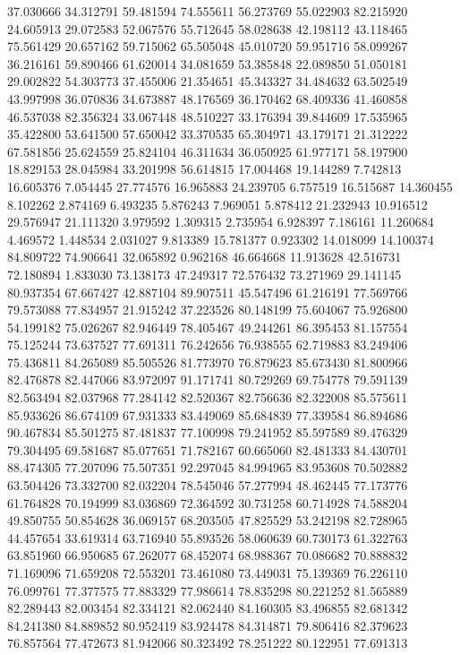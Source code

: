 37.030666
34.312791
59.481594
74.555611
56.273769
55.022903
82.215920
24.605913
29.072583
52.067576
55.712645
58.028638
42.198112
43.118465
75.561429
20.657162
59.715062
65.505048
45.010720
59.951716
58.099267
36.216161
59.890466
61.620014
34.081659
53.385848
22.089850
51.050181
29.002822
54.303773
37.455006
21.354651
45.343327
34.484632
63.502549
43.997998
36.070836
34.673887
48.176569
36.170462
68.409336
41.460858
46.537038
82.356324
33.067448
48.510227
33.176394
39.844609
17.535965
35.422800
53.641500
57.650042
33.370535
65.304971
43.179171
21.312222
67.581856
25.624559
25.824104
46.311634
36.050925
61.977171
58.197900
18.829153
28.045984
33.201998
56.614815
17.004468
19.144289
7.742813
16.605376
7.054445
27.774576
16.965883
24.239705
6.757519
16.515687
14.360455
8.102262
2.874169
6.493235
5.876243
7.969051
5.878412
21.232943
10.916512
29.576947
21.111320
3.979592
1.309315
2.735954
6.928397
7.186161
11.260684
4.469572
1.448534
2.031027
9.813389
15.781377
0.923302
14.018099
14.100374
84.809722
74.906641
32.065892
0.962168
46.664668
11.913628
42.516731
72.180894
1.833030
73.138173
47.249317
72.576432
73.271969
29.141145
80.937354
67.667427
42.887104
89.907511
45.547496
61.216191
77.569766
79.573088
77.834957
21.915242
37.223526
80.148199
75.604067
75.926800
54.199182
75.026267
82.946449
78.405467
49.244261
86.395453
81.157554
75.125244
73.637527
77.691311
76.242656
76.938555
62.719883
83.249406
75.436811
84.265089
85.505526
81.773970
76.879623
85.673430
81.800966
82.476878
82.447066
83.972097
91.171741
80.729269
69.754778
79.591139
82.563494
82.037968
77.284142
82.520367
82.756636
82.322008
85.575611
85.933626
86.674109
67.931333
83.449069
85.684839
77.339584
86.894686
90.467834
85.501275
87.481837
77.100998
79.241952
85.597589
89.476329
79.304495
69.581687
85.077651
71.782167
60.665060
82.481333
84.430701
88.474305
77.207096
75.507351
92.297045
84.994965
83.953608
70.502882
63.504426
73.332700
82.032204
78.545046
57.277994
48.462445
77.173776
61.764828
70.194999
83.036869
72.364592
30.731258
60.714928
74.588204
49.850755
50.854628
36.069157
68.203505
47.825529
53.242198
82.728965
44.457654
33.619314
63.716940
55.893526
58.060639
60.730173
61.322763
63.851960
66.950685
67.262077
68.452074
68.988367
70.086682
70.888832
71.169096
71.659208
72.553201
73.461080
73.449031
75.139369
76.226110
76.099761
77.377575
77.883329
77.986614
78.835298
80.221252
81.565889
82.289443
82.003454
82.334121
82.062440
84.160305
83.496855
82.681342
84.241380
84.889852
80.952419
83.924478
84.314871
79.806416
82.379623
76.857564
77.472673
81.942066
80.323492
78.251222
80.122951
77.691313
